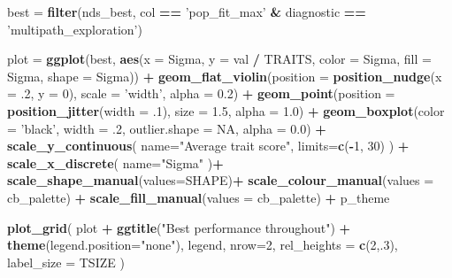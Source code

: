 \documentclass[]{book}
\newenvironment{Shaded}{\begin{snugshade}}{\end{snugshade}}
\newcommand{\DataTypeTok}[1]{\textcolor[rgb]{0.13,0.29,0.53}{#1}}
\newcommand{\DecValTok}[1]{\textcolor[rgb]{0.00,0.00,0.81}{#1}}
\newcommand{\FloatTok}[1]{\textcolor[rgb]{0.00,0.00,0.81}{#1}}
\newcommand{\KeywordTok}[1]{\textcolor[rgb]{0.13,0.29,0.53}{\textbf{#1}}}
\newcommand{\NormalTok}[1]{#1}
\newcommand{\OperatorTok}[1]{\textcolor[rgb]{0.81,0.36,0.00}{\textbf{#1}}}
\newcommand{\OtherTok}[1]{\textcolor[rgb]{0.56,0.35,0.01}{#1}}
\newcommand{\StringTok}[1]{\textcolor[rgb]{0.31,0.60,0.02}{#1}}
\begin{document}
\begin{Shaded}
\begin{Highlighting}[]
\NormalTok{best =}\StringTok{ }\KeywordTok{filter}\NormalTok{(nds_best, col }\OperatorTok{==}\StringTok{ 'pop_fit_max'} \OperatorTok{&}\StringTok{ }\NormalTok{diagnostic }\OperatorTok{==}\StringTok{ 'multipath_exploration'}\NormalTok{)}

\NormalTok{plot =}\StringTok{ }\KeywordTok{ggplot}\NormalTok{(best, }\KeywordTok{aes}\NormalTok{(}\DataTypeTok{x =}\NormalTok{ Sigma, }\DataTypeTok{y =}\NormalTok{ val }\OperatorTok{/}\StringTok{ }\NormalTok{TRAITS, }\DataTypeTok{color =}\NormalTok{ Sigma, }\DataTypeTok{fill =}\NormalTok{ Sigma, }\DataTypeTok{shape =}\NormalTok{ Sigma)) }\OperatorTok{+}
\StringTok{  }\KeywordTok{geom_flat_violin}\NormalTok{(}\DataTypeTok{position =} \KeywordTok{position_nudge}\NormalTok{(}\DataTypeTok{x =} \FloatTok{.2}\NormalTok{, }\DataTypeTok{y =} \DecValTok{0}\NormalTok{), }\DataTypeTok{scale =} \StringTok{'width'}\NormalTok{, }\DataTypeTok{alpha =} \FloatTok{0.2}\NormalTok{) }\OperatorTok{+}
\StringTok{  }\KeywordTok{geom_point}\NormalTok{(}\DataTypeTok{position =} \KeywordTok{position_jitter}\NormalTok{(}\DataTypeTok{width =} \FloatTok{.1}\NormalTok{), }\DataTypeTok{size =} \FloatTok{1.5}\NormalTok{, }\DataTypeTok{alpha =} \FloatTok{1.0}\NormalTok{) }\OperatorTok{+}
\StringTok{  }\KeywordTok{geom_boxplot}\NormalTok{(}\DataTypeTok{color =} \StringTok{'black'}\NormalTok{, }\DataTypeTok{width =} \FloatTok{.2}\NormalTok{, }\DataTypeTok{outlier.shape =} \OtherTok{NA}\NormalTok{, }\DataTypeTok{alpha =} \FloatTok{0.0}\NormalTok{) }\OperatorTok{+}
\StringTok{  }\KeywordTok{scale_y_continuous}\NormalTok{(}
    \DataTypeTok{name=}\StringTok{"Average trait score"}\NormalTok{,}
    \DataTypeTok{limits=}\KeywordTok{c}\NormalTok{(}\OperatorTok{-}\DecValTok{1}\NormalTok{, }\DecValTok{30}\NormalTok{)}
\NormalTok{  ) }\OperatorTok{+}
\StringTok{  }\KeywordTok{scale_x_discrete}\NormalTok{(}
    \DataTypeTok{name=}\StringTok{"Sigma"}
\NormalTok{  )}\OperatorTok{+}
\StringTok{  }\KeywordTok{scale_shape_manual}\NormalTok{(}\DataTypeTok{values=}\NormalTok{SHAPE)}\OperatorTok{+}
\StringTok{  }\KeywordTok{scale_colour_manual}\NormalTok{(}\DataTypeTok{values =}\NormalTok{ cb_palette) }\OperatorTok{+}
\StringTok{  }\KeywordTok{scale_fill_manual}\NormalTok{(}\DataTypeTok{values =}\NormalTok{ cb_palette) }\OperatorTok{+}
\StringTok{  }\NormalTok{p_theme}

\KeywordTok{plot_grid}\NormalTok{(}
\NormalTok{  plot }\OperatorTok{+}
\StringTok{    }\KeywordTok{ggtitle}\NormalTok{(}\StringTok{"Best performance throughout"}\NormalTok{) }\OperatorTok{+}
\StringTok{    }\KeywordTok{theme}\NormalTok{(}\DataTypeTok{legend.position=}\StringTok{"none"}\NormalTok{),}
\NormalTok{  legend,}
  \DataTypeTok{nrow=}\DecValTok{2}\NormalTok{,}
  \DataTypeTok{rel_heights =} \KeywordTok{c}\NormalTok{(}\DecValTok{2}\NormalTok{,.}\DecValTok{3}\NormalTok{),}
  \DataTypeTok{label_size =}\NormalTok{ TSIZE}
\NormalTok{)}
\end{Highlighting}
\end{Shaded}
\end{document}
